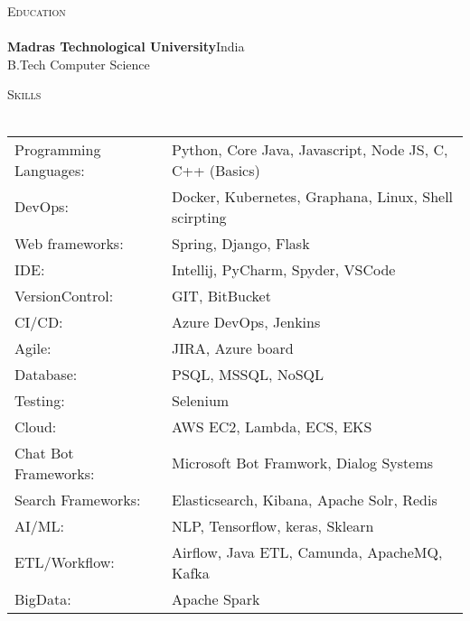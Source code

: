 \documentclass[a4paper]{article}
\newcommand{\lineunder} {
    \vspace*{-8pt} \\
    \hspace*{-18pt} \hrulefill \\
}
\newcommand{\header} [1] {
    {\hspace*{-18pt}\vspace*{6pt} \textsc{#1}}
    \vspace*{-6pt} \lineunder
}
\begin{document}
\header{Education}
\textbf{Madras Technological University}\hfill India\\
B.Tech Computer Science\\
\vspace{2mm}

\header{Skills}
\begin{tabular}{ l l }
	Programming Languages: & Python, Core Java, Javascript, Node JS, C, C++ (Basics) \\
	DevOps:                & Docker, Kubernetes, Graphana, Linux, Shell scirpting    \\
	Web frameworks:        & Spring, Django, Flask                                   \\
	IDE:                   & Intellij, PyCharm, Spyder, VSCode                       \\
	VersionControl:        & GIT, BitBucket                                          \\
	CI/CD:                 & Azure DevOps, Jenkins                                   \\
	Agile:                 & JIRA, Azure board                                       \\
	Database:              & PSQL, MSSQL, NoSQL                                      \\
	Testing:               & Selenium                                                \\
	Cloud:                 & AWS EC2, Lambda, ECS, EKS                               \\
	Chat Bot Frameworks:   & Microsoft Bot Framwork, Dialog Systems                  \\
	Search Frameworks:     & Elasticsearch, Kibana, Apache Solr, Redis               \\
	AI/ML:                 & NLP, Tensorflow, keras, Sklearn                         \\
	ETL/Workflow:          & Airflow, Java ETL, Camunda, ApacheMQ, Kafka             \\
	BigData:               & Apache Spark                                            \\
\end{tabular}
\vspace{2mm}
\end{document}

